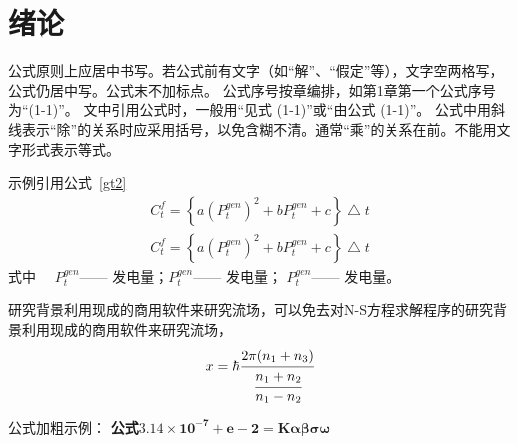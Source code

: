 \chapter{绪论}

公式原则上应居中书写。若公式前有文字（如“解”、“假定”等），文字空两格写，公式仍居中写。公式末不加标点。
公式序号按章编排，如第1章第一个公式序号为“(1-1)”。
文中引用公式时，一般用“见式 (1-1)”或“由公式 (1-1)”。
公式中用斜线表示“除”的关系时应采用括号，以免含糊不清。通常“乘”的关系在前。不能用文字形式表示等式。

示例引用公式~\ref{gt2}
\begin{gather}
    C^f_t=\left \{a(P_t^{gen})^2 + b P_t^{gen}+c\right \} \bigtriangleup t \label{gt2} \\
    C^f_t=\left \{a(P_t^{gen})^2 + b P_t^{gen}+c\right \} \bigtriangleup t \label{gt3}
\end{gather}
式中~~  $P_t^{gen}$------ 发电量；\breakwithtilde $P_t^{gen}$------ 发电量；
\breakwithtilde $P_t^{gen}$------ 发电量。

研究背景利用现成的商用软件来研究流场，可以免去对N-S方程求解程序的研究背景利用现成的商用软件来研究流场，
\begin{equation}
 x=\hbar\cfrac{2\pi(n_1+n_3)}{\cfrac{n_1+n_2}{n_1-n_2}}
 \label{gt1}
\end{equation}

公式加粗示例：
\textbf{公式$\bm{3.14\times10^{-7}+e-2=K\alpha \beta \sigma \omega}$}